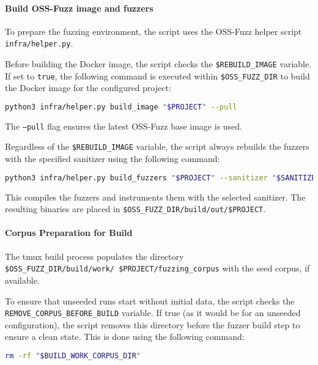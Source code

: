 \documentclass[11pt,a4paper,twocolumn]{article}
\begin{document}
\noindent \paragraph{Build OSS-Fuzz image and fuzzers} \label{sec:methodology_build} To prepare the fuzzing environment, the script uses the OSS-Fuzz helper script \texttt{infra/helper.py}.

Before building the Docker image, the script checks the \texttt{\$REBUILD\_IMAGE} variable. If set to \texttt{true}, the following command is executed within \texttt{\$OSS\_FUZZ\_DIR} to build the Docker image for the configured project:

\begin{lstlisting}[language=bash, caption={Bash script to build the Docker image for the configured project}]
python3 infra/helper.py build_image "$PROJECT" --pull
\end{lstlisting}
The \texttt{---pull} flag ensures the latest OSS-Fuzz base image is used.

Regardless of the \texttt{\$REBUILD\_IMAGE} variable, the script always rebuilds the fuzzers with the specified sanitizer using the following command:
\begin{lstlisting}[language=bash, caption={OSS-Fuzz helper script command to build the project fuzzers with the specified sanitizer}]
python3 infra/helper.py build_fuzzers "$PROJECT" --sanitizer "$SANITIZER"
\end{lstlisting}
This compiles the fuzzers and instruments them with the selected sanitizer. The resulting binaries are placed in \texttt{\$OSS\_FUZZ\_DIR/build/out/\$PROJECT}.

\noindent \paragraph{Corpus Preparation for Build} \label{sec:methodology_corpus_prep_build} The tmux build process populates the directory \texttt{\$OSS\_FUZZ\_DIR/build/work/\ \$PROJECT/fuzzing\_corpus} with the seed corpus, if available.

To ensure that unseeded runs start without initial data, the script checks the \texttt{REMOVE\_CORPUS\_BEFORE\_BUILD} variable. If true (as it would be for an unseeded configuration), the script removes this directory before the fuzzer build step to ensure a clean state. This is done using the following command:

\begin{lstlisting}[language=bash, caption=Bash command to remove the build-time corpus directory for unseeded runs]
rm -rf "$BUILD_WORK_CORPUS_DIR"
\end{lstlisting}
\end{document}
